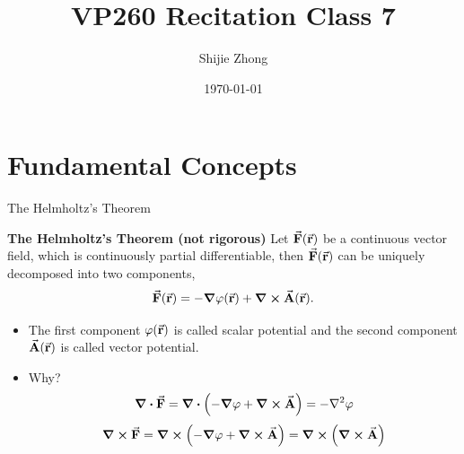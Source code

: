 \documentclass[9pt]{beamer}
\title[VP260 RC]{VP260 Recitation Class 7} %
\author{Shijie Zhong} %
\institute[UM-SJTU JI] %
{
    University of Michigan - Shanghai Jiao Tong University Joint Institute\\%
\medskip
}
\date{\today} %
\begin{document}
\begin{frame}
    \titlepage %
\end{frame}



\section{Fundamental Concepts} %

\begin{frame}{The Helmholtz's Theorem}
    \begin{beamerboxesrounded}[shadow=true]{\bf The Helmholtz's Theorem (not rigorous)}
        Let $\va{F}(\va{r})$  be a continuous vector field, which is continuously partial differentiable, then $\va{F}(\va{r})$ can be uniquely decomposed into two components,
        \begin{equation}
            \va{F} (\va{r}) = -\grad{\varphi(\va{r})} + \curl{\va{A}(\va{r})}.
        \end{equation}
    \end{beamerboxesrounded}

    \begin{itemize}
        \item The first component $\varphi(\va{r})$ is called scalar potential and the second component $\va{A} (\va{r})$ is called vector potential.
        \item Why?
        \begin{equation}
            \div{\va{F}} = \div(-\grad{\varphi} + \curl{\va{A}}) = -\laplacian{\varphi}
        \end{equation}
        \begin{equation}
            \curl{\va{F}} = \curl(-\grad{\varphi} + \curl{\va{A}}) = \curl(\curl{\va{A}})
        \end{equation}
    \end{itemize}
\end{frame}
\end{document}
